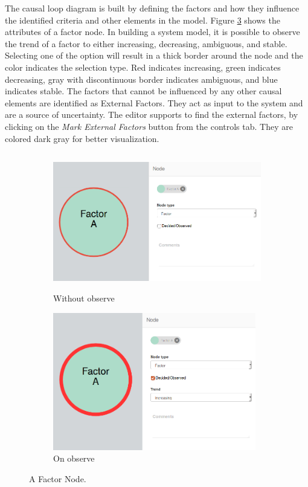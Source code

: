 \documentclass[a4paper]{article}
\begin{document}
The causal loop diagram is built by defining the factors and how they influence the identified criteria and other elements in the model. Figure \ref{fig:factors} shows the attributes of a factor node. In building a system model, it is possible to observe the trend of a factor to either increasing, decreasing, ambiguous, and stable. Selecting one of the option will result in a thick border around the node and the color indicates the selection type. Red indicates increasing, green indicates decreasing, gray with discontinuous border indicates ambiguous, and blue indicates stable. The factors that cannot be influenced by any other causal elements are identified as External Factors. They act as input to the system and are a source of uncertainty. The editor supports to find the external factors, by clicking on the \textit{Mark External Factors} button from the controls tab. They are colored dark gray for better visualization.

\begin{figure}[h]
\begin{subfigure}{1.0\textwidth}
\includegraphics[width=0.75\linewidth, height=6cm]{img/factor.png} 
\caption{Without observe}
\label{fig:factor}
\end{subfigure}
\begin{subfigure}{1.0\textwidth}
\includegraphics[width=0.75\linewidth, height=6cm]{img/factor1.png}
\caption{On observe}
\label{fig:factor1}
\end{subfigure}
\caption{A Factor Node.}
\label{fig:factors}
\end{figure}
\end{document}
